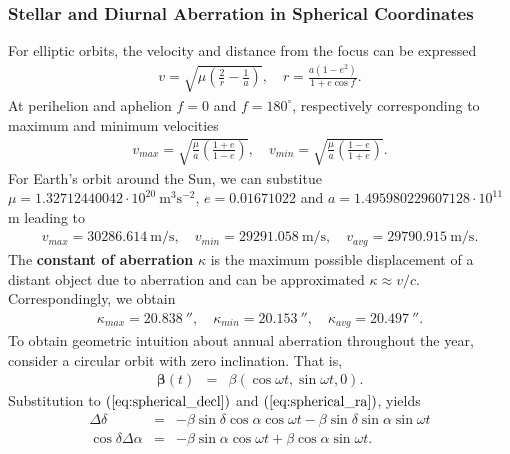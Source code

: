 \documentclass [12pt, a4paper] {article}
\newcommand{\vc}[1]
{
	\boldsymbol{#1}
}
\begin{document}
\subsubsection{Stellar and Diurnal Aberration in Spherical Coordinates}
For elliptic orbits, the velocity and distance from the focus can be 
expressed 
\begin {eqnarray}
    v 
    =
    \sqrt{
        \mu\left(\frac{2}{r} - \frac{1}{a}\right)
    },
    \quad
    r 
    = \frac{a(1-e^2)}{1 + e\cos f}.
\end {eqnarray}
At perihelion and aphelion $f=0$ and $f=180^\circ$, respectively corresponding
to maximum and minimum velocities
\begin {eqnarray}
    v_{max} = \sqrt{
        \frac{\mu}{a}
        \left(
            \frac{1+e}{1-e}
        \right)
    },
    \quad
    v_{min} = \sqrt{
        \frac{\mu}{a}
        \left(
            \frac{1-e}{1+e}
        \right)
    }.
\end {eqnarray}
For Earth's orbit around the Sun, we can substitue 
$\mu = 1.32712440042\cdot 10^{20}\:\textrm{m}^3\textrm{s}^{-2}$, 
$e = 0.01671022$ and $a=1.495980229607128\cdot 10^{11}$ m leading to
\begin {eqnarray}
    v_{max} = 30286.614\:\textrm{m/s},
    \quad
    v_{min} = 29291.058\:\textrm{m/s},
    \quad 
    v_{avg} = 29790.915\:\textrm{m/s}.
\end {eqnarray}
The \textbf{constant of aberration} $\kappa$ is the maximum possible displacement 
of a distant object due to aberration and can be approximated $\kappa\approx v/c$.
Correspondingly, we obtain 
\begin {eqnarray}
    \kappa_{max} = \SI{20.838}{\arcsecond}, 
    \quad
    \kappa_{min} = \SI{20.153}{\arcsecond} , 
    \quad
    \kappa_{avg} = \SI{20.497}{\arcsecond}. 
\end {eqnarray}
To obtain geometric intuition about annual aberration throughout the year, 
consider a circular orbit with zero inclination. That is, 
\begin {eqnarray}
    \vc\beta (t) &=& \beta(\cos\omega t, \sin\omega t, 0).
\end {eqnarray}
Substitution to $(\ref{eq:spherical_decl})$ and $(\ref{eq:spherical_ra})$,
yields 
\begin {eqnarray}
    \Delta\delta &=& 
    -\beta \sin\delta\cos\alpha \cos\omega t
    -\beta \sin\delta\sin\alpha \sin\omega t
    \\
    \cos\delta\Delta\alpha &=& 
    -\beta \sin\alpha \cos\omega t
    +\beta \cos\alpha \sin\omega t.
\end {eqnarray}
\end{document}
